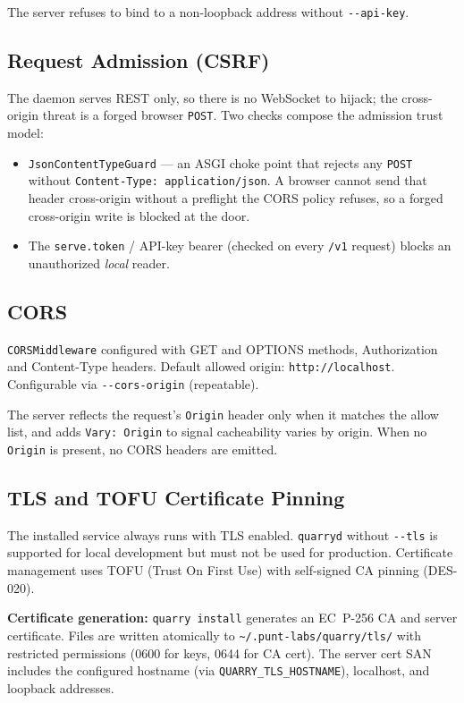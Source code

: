 \documentclass[a4paper,10pt]{article}
\begin{document}
The server refuses to bind to a non-loopback address without
\texttt{-{}-api-key}.

\subsection{Request Admission (CSRF)}

The daemon serves REST only, so there is no WebSocket to hijack; the
cross-origin threat is a forged browser \texttt{POST}.  Two checks
compose the admission trust model:

\begin{itemize}
  \item \texttt{JsonContentTypeGuard} --- an ASGI choke point that
    rejects any \texttt{POST} without \texttt{Content-Type:
    application/json}.  A browser cannot send that header cross-origin
    without a preflight the CORS policy refuses, so a forged
    cross-origin write is blocked at the door.
  \item The \texttt{serve.token} / API-key bearer (checked on every
    \texttt{/v1} request) blocks an unauthorized \emph{local} reader.
\end{itemize}

\subsection{CORS}

\texttt{CORSMiddleware} configured with GET and OPTIONS methods,
Authorization and Content-Type headers.  Default allowed origin:
\texttt{http://localhost}.  Configurable via \texttt{-{}-cors-origin}
(repeatable).

The server reflects the request's \texttt{Origin} header only when it
matches the allow list, and adds \texttt{Vary: Origin} to signal
cacheability varies by origin.  When no \texttt{Origin} is present,
no CORS headers are emitted.

\subsection{TLS and TOFU Certificate Pinning}

The installed service always runs with TLS enabled.  \texttt{quarryd}
without \texttt{-{}-tls} is supported for local development but
must not be used for production.  Certificate management uses TOFU
(Trust On First Use) with self-signed CA pinning (DES-020).

\textbf{Certificate generation:} \texttt{quarry install} generates
an EC~P-256 CA and server certificate.  Files are written atomically
to \texttt{\~{}/.punt-labs/quarry/tls/} with restricted permissions
(0600 for keys, 0644 for CA cert).  The server cert SAN includes the
configured hostname (via \texttt{QUARRY\_TLS\_HOSTNAME}), localhost,
and loopback addresses.
\end{document}
